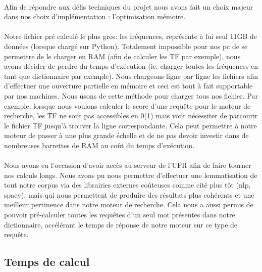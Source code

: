 \documentclass[10pt,a4paper]{article}
\begin{document}
\paragraph{}Afin de répondre aux défis techniques du projet nous avons fait un choix majeur dans nos choix d’implémentation : l'optimisation mémoire.
\paragraph{}Notre fichier pré calculé le plus gros: les fréquences, représente à lui seul 11GB de données (lorsque chargé sur Python). Totalement impossible pour nos pc de se permettre de le charger en RAM (afin de calculer les TF par exemple), nous avons décider de perdre du temps d'exécution (ie. charger toutes les fréquences en tant que dictionnaire par exemple). Nous chargeons ligne par ligne les fichiers afin d'effectuer une ouverture partielle en mémoire et ceci est tout à fait supportable par nos machines. Nous usons de cette méthode pour charger tous nos fichier. Par exemple, lorsque nous voulons calculer le score d'une requête pour le moteur de recherche, les TF ne sont pas accessibles en 0(1) mais vont nécessiter de parcourir le fichier TF jusqu'à trouver la ligne correspondante. Cela peut permettre à notre moteur de passer à une plus grande échelle et de ne pas devoir investir dans de nombreuses barrettes de RAM au coût du temps d'exécution.
\paragraph{}Nous avons eu l'occasion d'avoir accès au serveur de l'UFR afin de faire tourner nos calculs longs. Nous avons pu nous permettre d'effectuer une lemmatisation de tout notre corpus via des librairies externes coûteuses comme cité plus tôt (nlp, spacy), mais qui nous permettent de produire des résultats plus cohérents et une meilleur pertinence dans notre moteur de recherche. Cela nous a aussi permis de pouvoir pré-calculer toutes les requêtes d'un seul mot présentes dans notre dictionnaire, accélérant le temps de réponse de notre moteur sur ce type de requête.

\subsection{Temps de calcul}
\end{document}
